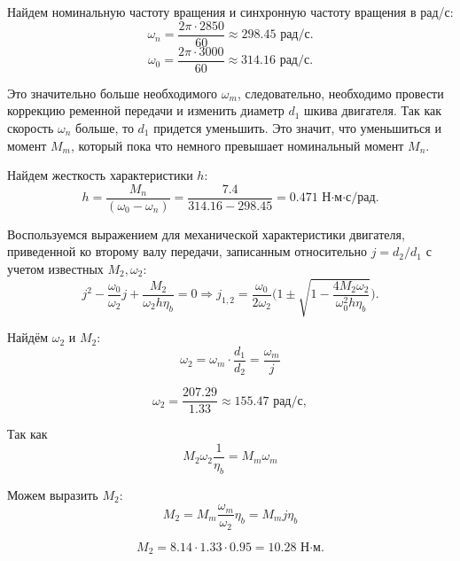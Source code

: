 \documentclass[a4paper, 14pt]{extarticle}
\begin{document}
	\par Найдем номинальную частоту вращения и синхронную частоту вращения в рад/с:
	$$\omega_n=\dfrac{2\pi\cdot2850}{60} \approx 298.45 \text{ рад/с}.$$
	$$\omega_0=\dfrac{2\pi\cdot3000}{60} \approx 314.16 \text{ рад/с}.$$
	
	\par Это значительно больше необходимого $\omega_m$, следовательно, необходимо провести коррекцию ременной передачи и изменить диаметр $d_1$ шкива двигателя. Так как скорость $\omega_n$ больше, то $d_1$ придется уменьшить. Это значит, что уменьшиться и момент $M_m$, который пока что немного превышает номинальный момент $M_n$.
	\par Найдем жесткость характеристики $h$:
	$$h=\dfrac{M_n}{(\omega_0-\omega_n)} = \dfrac{7.4}{314.16-298.45} = 0.471 \text{ Н·м·с/рад}.$$
	\par Воспользуемся выражением для механической характеристики двигателя, приведенной ко второму валу передачи, записанным относительно $j=d_2/d_1$ с учетом известных $M_2,\omega_2$:
	\begin{equation}
		j^2-\dfrac{\omega_0}{\omega_2}j+\dfrac{M_2}{\omega_2 h \eta_b}=0 \Rightarrow j_{1,2}=\dfrac{\omega_0}{2\omega_2}\bigg(1\pm \sqrt{1-\dfrac{4M_2\omega_2}{\omega_0^2 h \eta_b}}\bigg).
	\end{equation}
	
	
	\par Найдём $\omega_2$ и $M_2$:
	\begin{equation}
		\omega_2 = \omega_m\cdot \dfrac{d_1}{d_2} = \dfrac{\omega_m}{j}
	\end{equation}
	
	$$\omega_2  =  \dfrac{207.29}{1.33} \approx 155.47 \text{ рад/с},$$
	
	Так как 
	\begin{equation}
		M_2\omega_2\dfrac{1}{\eta_b} = M_m\omega_m
	\end{equation}
	
	Можем выразить $M_2$:
	\begin{equation}
		M_2=M_m\dfrac{\omega_m}{\omega_2}\eta_b = M_mj\eta_b
	\end{equation}
	
	$$ M_2= 8.14\cdot1.33\cdot0.95 =  10.28\text{ Н·м}.$$
	
\end{document}
